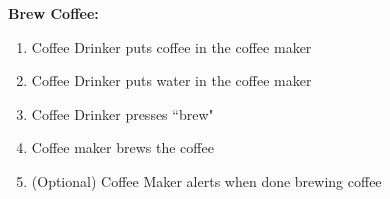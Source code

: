\documentclass[letterpaper]{article}
\begin{document}
\noindent
\textbf{Brew Coffee:  }
\begin{enumerate}
\item Coffee Drinker puts coffee in the coffee maker
\item Coffee Drinker puts water in the coffee maker
\item Coffee Drinker presses ``brew"
\item Coffee maker brews the coffee
\item (Optional) Coffee Maker alerts when done brewing coffee
\end{enumerate}
\end{document}
